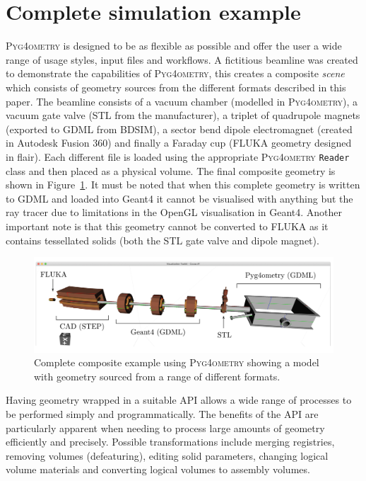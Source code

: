 \documentclass[preprint,12pt]{elsarticle}
\newcommand{\pyinline}[1]{\lstinline[postbreak={}]{#1}}
\newcommand{\PYGEOMETRY}{\textsc{Pyg4ometry}}
\begin{document}
\section{Complete simulation example}
\PYGEOMETRY{} is designed to be as flexible as possible and offer the user a wide range of usage styles, input files
and workflows. A fictitious beamline was created to demonstrate the capabilities of \PYGEOMETRY, this creates a composite
\emph{scene} which consists of geometry sources from the different formats described in this paper. The beamline consists of a vacuum chamber
(modelled in \PYGEOMETRY{}), a vacuum gate valve (STL from the manufacturer), a triplet of quadrupole magnets (exported to GDML
from BDSIM), a sector bend dipole electromagnet (created in Autodesk Fusion 360) and finally a Faraday cup (FLUKA geometry designed in
flair). Each different file is loaded using the appropriate \PYGEOMETRY{} \pyinline{Reader} class and then placed as a physical volume. The final composite
geometry is shown in Figure~\ref{fig:model}. It must be noted that when this complete geometry is written to GDML and loaded into
Geant4 it cannot be visualised with anything but the ray tracer due to limitations in the OpenGL visualisation in Geant4. Another
important note is that this geometry cannot be converted to FLUKA as it contains tessellated solids (both the STL gate valve and
dipole magnet).
%
\begin{figure}
\begin{center}
\includegraphics[width=1.0\textwidth]{model.pdf}
\caption{Complete composite example using \PYGEOMETRY{} showing a model with geometry sourced from a range of different formats.}
\label{fig:model}
\end{center}
\end{figure}

Having geometry wrapped in a suitable API allows a wide range of processes to be performed simply and programmatically. The benefits of the API are
particularly apparent when needing to process large amounts of geometry efficiently and precisely. Possible transformations include merging registries,
removing volumes (defeaturing), editing solid parameters, changing logical volume materials and converting logical volumes to assembly volumes.
\end{document}
